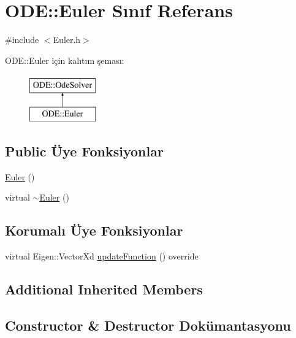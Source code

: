 \hypertarget{classODE_1_1Euler}{}\section{O\+DE\+::Euler Sınıf Referans}
\label{classODE_1_1Euler}


{\ttfamily \#include $<$Euler.\+h$>$}

O\+DE\+::Euler için kalıtım şeması\+:\begin{figure}[H]
\begin{center}
\leavevmode
\includegraphics[height=2.000000cm]{classODE_1_1Euler}
\end{center}
\end{figure}
\subsection*{Public Üye Fonksiyonlar}
\begin{DoxyCompactItemize}
\item 
\mbox{\hyperlink{classODE_1_1Euler_a599096399e51bbf20c4fd666eb464e20}{Euler}} ()
\item 
virtual \mbox{\hyperlink{classODE_1_1Euler_ae2e069205ac7b0fe678e67a100954167}{$\sim$\+Euler}} ()
\end{DoxyCompactItemize}
\subsection*{Korumalı Üye Fonksiyonlar}
\begin{DoxyCompactItemize}
\item 
virtual Eigen\+::\+Vector\+Xd \mbox{\hyperlink{classODE_1_1Euler_a8d8ea2d464ecbbcc7258eaf660f57903}{update\+Function}} () override
\end{DoxyCompactItemize}
\subsection*{Additional Inherited Members}


\subsection{Constructor \& Destructor Dokümantasyonu}
\mbox{\label{classODE_1_1Euler_a599096399e51bbf20c4fd666eb464e20}} 
